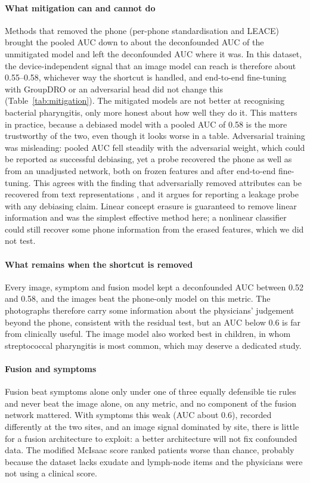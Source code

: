 \documentclass[preprint,12pt]{elsarticle}
\begin{document}
\paragraph{What mitigation can and cannot do} Methods that removed the phone (per-phone standardisation and LEACE) brought the pooled AUC down to about the deconfounded AUC of the unmitigated model and left the deconfounded AUC where it was. In this dataset, the device-independent signal that an image model can reach is therefore about 0.55--0.58, whichever way the shortcut is handled, and end-to-end fine-tuning with GroupDRO or an adversarial head did not change this (Table~\ref{tab:mitigation}). The mitigated models are not better at recognising bacterial pharyngitis, only more honest about how well they do it. This matters in practice, because a debiased model with a pooled AUC of 0.58 is the more trustworthy of the two, even though it looks worse in a table. Adversarial training was misleading: pooled AUC fell steadily with the adversarial weight, which could be reported as successful debiasing, yet a probe recovered the phone as well as from an unadjusted network, both on frozen features and after end-to-end fine-tuning. This agrees with the finding that adversarially removed attributes can be recovered from text representations \cite{elazar2018adversarial}, and it argues for reporting a leakage probe with any debiasing claim. Linear concept erasure is guaranteed to remove linear information \cite{belrose2023leace} and was the simplest effective method here; a nonlinear classifier could still recover some phone information from the erased features, which we did not test.

\paragraph{What remains when the shortcut is removed} Every image, symptom and fusion model kept a deconfounded AUC between 0.52 and 0.58, and the images beat the phone-only model on this metric. The photographs therefore carry some information about the physicians' judgement beyond the phone, consistent with the residual test, but an AUC below 0.6 is far from clinically useful. The image model also worked best in children, in whom streptococcal pharyngitis is most common, which may deserve a dedicated study.

\paragraph{Fusion and symptoms} Fusion beat symptoms alone only under one of three equally defensible tie rules and never beat the image alone, on any metric, and no component of the fusion network mattered. With symptoms this weak (AUC about 0.6), recorded differently at the two sites, and an image signal dominated by site, there is little for a fusion architecture to exploit: a better architecture will not fix confounded data. The modified McIsaac score ranked patients worse than chance, probably because the dataset lacks exudate and lymph-node items and the physicians were not using a clinical score.
\end{document}
